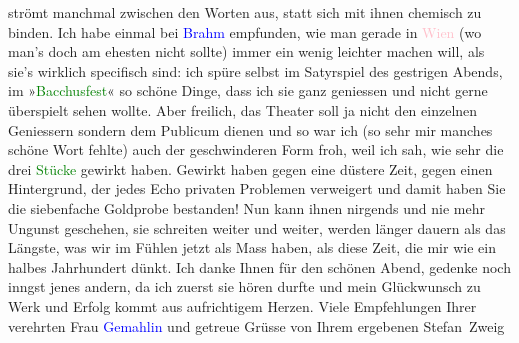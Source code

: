                strömt manchmal zwischen den Worten aus, statt sich mit ihnen chemisch zu binden. Ich
               habe einmal bei \textcolor{blue}{Brahm}\ledrightnote{\textcolor{blue}{Otto Brahm}} empfunden, wie man
               gerade in \textcolor{pink}{Wien}\ledrightnote{\textcolor{pink}{Wien}} (wo man’s doch am ehesten \introOben{}nicht\introOben{} sollte) immer ein wenig leichter machen will, als sie's
               wirklich specifisch sind: ich spüre selbst im Satyrspiel des gestrigen Abends, im
                  »\textcolor{green}{Bacchusfest}\ledrightnote{\textcolor{green}{Das Bacchusfest}}« so schöne Dinge, dass ich sie
               ganz geniessen und nicht gerne überspielt sehen wollte. Aber freilich, das Theater
               soll ja nicht den einzelnen Geniessern sondern dem Publicum dienen und so war ich (so
               sehr mir manches schöne Wort fehlte) auch der geschwinderen Form froh, weil ich sah,
               wie sehr die drei \textcolor{green}{Stücke}\ledrightnote{\textcolor{green}{Komödie der Worte. Drei Einakter}} gewirkt haben. Gewirkt
               haben gegen eine düstere Zeit, gegen einen Hintergrund, der jedes Echo privaten
               Problemen verweigert und damit \introOben{}haben Sie\introOben{} die siebenfache Goldprobe {\pb}bestanden! Nun kann ihnen nirgends und
               nie mehr Ungunst geschehen, sie schreiten weiter und weiter, werden länger dauern als
               das Längste, was wir im Fühlen jetzt als Mass haben, als diese Zeit, die mir wie ein
               halbes Jahrhundert dünkt. Ich danke Ihnen für den schönen Abend, gedenke noch inngst
               jenes andern, da ich zuerst sie hören durfte und mein Glückwunsch zu Werk und Erfolg
               kommt aus aufrichtigem Herzen. Viele Empfehlungen Ihrer verehrten Frau \textcolor{blue}{Gemahlin}\ledrightnote{{$\rightarrow$}\emph{\textcolor{blue}{Olga Schnitzler}}} und getreue Grüsse
               von Ihrem ergebenen\pend
           \pstart \spacefill\mbox{Stefan Zweig}\pend{}\endnumbering{}  
      